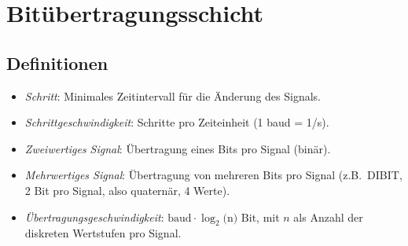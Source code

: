 \documentclass[a4paper,parskip=half*,DIV=15,fontsize=11pt]{scrartcl}
\begin{document}
\section{Bitübertragungsschicht}
\subsection{Definitionen}
\begin{itemize}
\item \emph{Schritt}: Minimales Zeitintervall für die Änderung des Signals.
\item \emph{Schrittgeschwindigkeit}: Schritte pro Zeiteinheit (1 baud = 1/s).
\item \emph{Zweiwertiges Signal}: Übertragung eines Bits pro Signal (binär).
\item \emph{Mehrwertiges Signal}: Übertragung von mehreren Bits pro Signal (z.B.\ DIBIT, 2 Bit pro Signal, also quaternär, 4 Werte).
\item \emph{Übertragungsgeschwindigkeit}: $\textrm{baud} \cdot \log_2($n$) \textrm{ Bit}$, mit $n$ als Anzahl der diskreten Wertstufen pro Signal.
\end{itemize}
\end{document}
